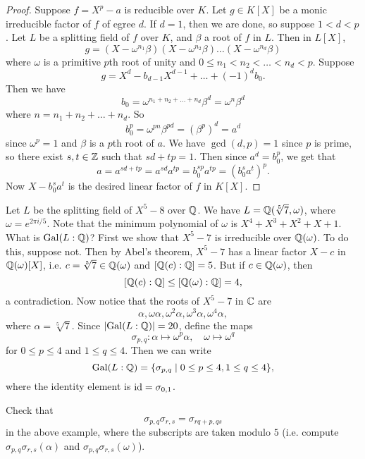 \begin{proof}
  Suppose $f = X^p - a$ is reducible over $K$. Let
  $g \in K[X]$ be a monic irreducible factor of $f$ of
  egree $d$. If $d = 1$, then we are done, so suppose
  $1 < d < p$. Let $L$ be a splitting field of $f$
  over $K$, and $\beta$ a root of $f$ in $L$. Then in
  $L[X]$,
  \[
    g = (X - \omega^{n_1} \beta) (X - \omega^{n_2} \beta) \dots (X - \omega^{n_d} \beta)
  \]
  where $\omega$ is a primitive $p$th root of unity and
  $0 \le n_1 < n_2 < \dots < n_d < p$. Suppose
  \[
    g = X^d - b_{d - 1} X^{d - 1} + \dots + (-1)^d b_0.
  \]
  Then we have
  \[
    b_0 = \omega^{n_1 + n_2 + \dots + n_d} \beta^d
    = \omega^n \beta^d
  \]
  where $n = n_1 + n_2 + \dots + n_d$. So
  \[
    b_0^p = \omega^{pn} \beta^{pd} = (\beta^p)^d = a^d
  \]
  since $\omega^p = 1$ and $\beta$ is a $p$th root of $a$. We have
  $\gcd(d, p) = 1$ since $p$ is prime, so there exist
  $s, t \in \mathbb{Z}$ such that
  $sd + tp = 1$.
  Then since $a^d = b_0^p$, we get that
  \[
    a = a^{sd + tp} = a^{sd} a^{tp} = b_0^{sp} a^{tp}
    = (b_0^s a^t)^p.
  \]
  Now $X - b_0^s a^t$ is the desired linear factor of $f$
  in $K[X]$.
\end{proof}

\begin{example}
  Let $L$ be the splitting field of $X^5 - 8$ over
  $\mathbb{Q}$. We have $L = \mathbb{Q}(\sqrt[5]{7}, \omega)$, where
  $\omega = e^{2\pi i / 5}$. Note that the minimum
  polynomial of $\omega$ is
  $X^4 + X^3 + X^2 + X + 1$.
  What is $\operatorname{Gal}(L : \mathbb{Q})$? First we show that
  $X^5 - 7$ is irreducible over $\mathbb{Q}(\omega)$. To do this,
  suppose not. Then by Abel's theorem, $X^5 - 7$ has a
  linear factor $X - c$ in $\mathbb{Q}(\omega)[X]$, i.e.
  $c = \sqrt[5]{7} \in \mathbb{Q}(\omega)$ and
  $[\mathbb{Q}(c) : \mathbb{Q}] = 5$. But if $c \in \mathbb{Q}(\omega)$, then
  \[
    [\mathbb{Q}(c) : \mathbb{Q}] \le [\mathbb{Q}(\omega) : \mathbb{Q}] = 4,
  \]
  a contradiction. Now notice that the roots of $X^5 - 7$ in $\mathbb{C}$ are
  \[
    \alpha, \omega \alpha, \omega^2 \alpha, \omega^3 \alpha, \omega^4 \alpha,
  \]
  where $\alpha = \sqrt[5]{7}$. Since
  $|{\operatorname{Gal}(L : \mathbb{Q})}| = 20$, define the maps
  \[
    \sigma_{p, q} : \alpha \mapsto \omega^p \alpha, \quad \omega \mapsto \omega^q
  \]
  for $0 \le p \le 4$ and $1 \le q \le 4$. Then we can
  write
  \[
    \operatorname{Gal}(L : \mathbb{Q}) = \{\sigma_{p, q} \mid 0 \le p \le 4, 1 \le q \le 4\},
  \]
  where the identity element is $\mathrm{id} = \sigma_{0, 1}$.
\end{example}

\begin{exercise}
  Check that
  \[\sigma_{p, q} \sigma_{r, s} = \sigma_{rq + p, qs}\]
  in the above example,
  where the subscripts are taken modulo $5$ (i.e.
  compute $\sigma_{p, q} \sigma_{r, s}(\alpha)$
  and $\sigma_{p, q} \sigma_{r, s}(\omega)$).
\end{exercise}
